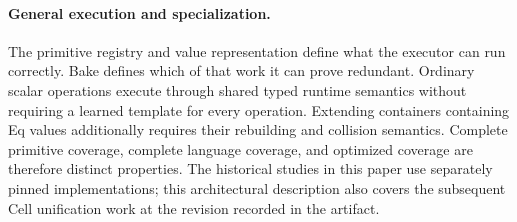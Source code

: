 \paragraph{General execution and specialization.}
The primitive registry and value representation define what the executor can
run correctly. Bake defines which of that work it can prove redundant. Ordinary
scalar operations execute through shared typed runtime semantics without
requiring a learned template for every operation. Extending containers containing
Eq values additionally requires their rebuilding and collision semantics.
Complete primitive coverage, complete language coverage, and optimized coverage
are therefore distinct properties. The historical studies in this paper use
separately pinned implementations; this architectural description also covers
the subsequent Cell unification work at the revision recorded in the artifact.
